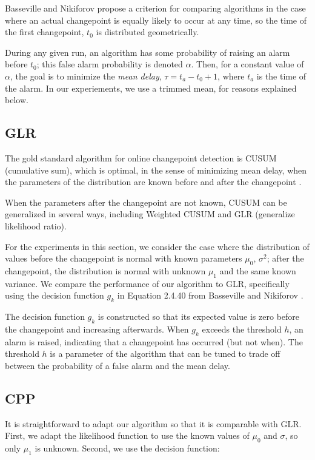 \documentclass[twocolumn,11pt]{article}
\begin{document}
Basseville and Nikiforov \cite{basseville93detection} propose a
criterion for comparing algorithms in the case where an actual
changepoint is equally likely to occur at any time, so the time of the
first changepoint, $t_0$ is distributed geometrically.

During any given run, an algorithm has some probability of
raising an alarm before $t_0$; this false alarm probability is
denoted $\alpha$.  Then, for a constant value of $\alpha$, the
goal is to minimize the {\em mean delay}, $\tau = t_a - t_0 +1$,
where $t_a$ is the time of the alarm.  In our experiements, we
use a trimmed mean, for reasons explained below.

\subsection{GLR}

The gold standard algorithm for online changepoint detection is
CUSUM (cumulative sum), which is optimal, in the sense of minimizing
mean delay, when the parameters of the distribution
are known before and after the changepoint \cite{basseville93detection}.

When the parameters after the changepoint are not known, CUSUM
can be generalized in several ways, including Weighted CUSUM and
GLR (generalize likelihood ratio).

For the experiments in this section, we consider the case where the
distribution of values before the changepoint is normal with known
parameters $\mu_0$, $\sigma^2$; after the changepoint, the
distribution is normal with unknown $\mu_1$ and the same known
variance.  We compare the performance of our algorithm to GLR,
specifically using the decision function $g_k$ in
Equation 2.4.40 from Basseville and
Nikiforov \cite{basseville93detection}.

The decision function $g_k$ is constructed so that its expected value
is zero before the changepoint and increasing afterwards.  When
$g_k$ exceeds the threshold $h$, an alarm is raised, indicating that
a changepoint has occurred (but not when).  The threshold $h$ is
a parameter of the algorithm that can be tuned to trade off between
the probability of a false alarm and the mean delay.

\subsection{CPP}

It is straightforward to adapt our algorithm so that it is comparable
with GLR.  First, we adapt the likelihood function to use the known
values of $\mu_0$ and $\sigma$, so only $\mu_1$ is unknown.  Second, we
use the decision function:
\end{document}
